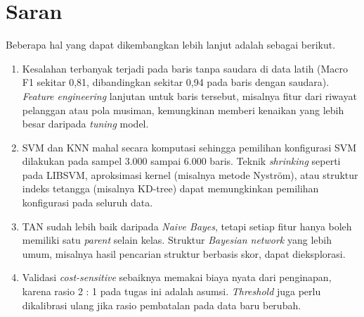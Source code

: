 \section{Saran}
\label{sec:saran}

Beberapa hal yang dapat dikembangkan lebih lanjut adalah sebagai berikut.

\begin{enumerate}
	\item Kesalahan terbanyak terjadi pada baris tanpa saudara di data latih (Macro F1 sekitar 0,81,
	dibandingkan sekitar 0,94 pada baris dengan saudara). \textit{Feature engineering} lanjutan untuk
	baris tersebut, misalnya fitur dari riwayat pelanggan atau pola musiman, kemungkinan memberi
	kenaikan yang lebih besar daripada \textit{tuning} model.
	\item SVM dan KNN mahal secara komputasi sehingga pemilihan konfigurasi SVM dilakukan pada sampel
	3.000 sampai 6.000 baris. Teknik \textit{shrinking} seperti pada LIBSVM, aproksimasi kernel
	(misalnya metode Nyström), atau struktur indeks tetangga (misalnya KD-tree) dapat memungkinkan
	pemilihan konfigurasi pada seluruh data.
	\item TAN sudah lebih baik daripada \textit{Naive Bayes}, tetapi setiap fitur hanya boleh memiliki
	satu \textit{parent} selain kelas. Struktur \textit{Bayesian network} yang lebih umum, misalnya hasil
	pencarian struktur berbasis skor, dapat dieksplorasi.
	\item Validasi \textit{cost-sensitive} sebaiknya memakai biaya nyata dari penginapan, karena rasio
	2 : 1 pada tugas ini adalah asumsi. \textit{Threshold} juga perlu dikalibrasi ulang jika rasio
	pembatalan pada data baru berubah.
\end{enumerate}
